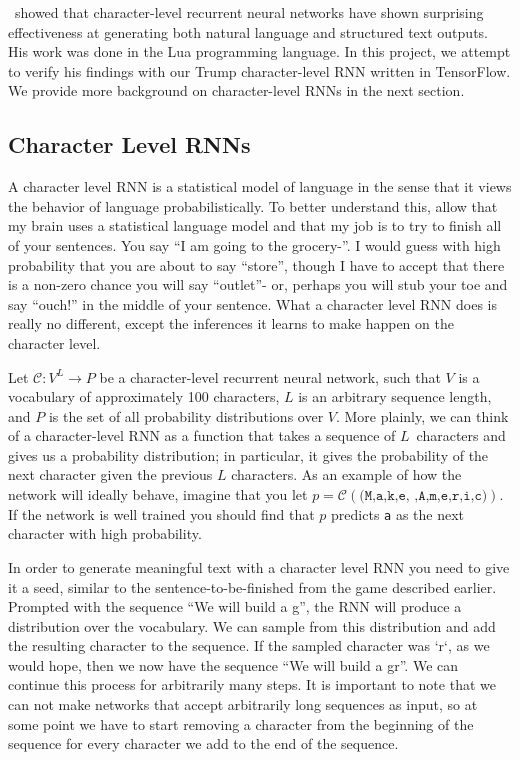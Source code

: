 \documentclass{article}
\begin{document}
\cite{karapathy2015}~showed that character-level recurrent neural networks have shown surprising effectiveness at generating both natural language and structured text outputs. His work was done in the Lua programming language.  In this project, we attempt to verify his findings with our Trump character-level RNN written in TensorFlow.  We provide more background on character-level RNNs in the next section.


\subsection{Character Level RNNs}

A character level RNN is a statistical model of language in the sense that it views the behavior of language probabilistically. To better understand this, allow that my brain uses a statistical language model and that my job is to try to finish all of your sentences. You say ``I am going to the grocery-''. I would guess with high probability that you are about to say ``store'', though I have to accept that there is a non-zero chance you will say ``outlet''- or, perhaps you will stub your toe and say ``ouch!'' in the middle of your sentence. What a character level RNN does is really no different, except the inferences it learns to make happen on the character level.

Let $\mathcal{C} : V^L \rightarrow P$ be a character-level recurrent neural network, such that $V$ is a vocabulary of approximately 100 characters, $L$ is an arbitrary sequence length, and $P$ is the set of all probability distributions over $V$. More plainly, we can think of a character-level RNN as a function that takes a sequence of $L$~characters and gives us a probability distribution; in particular, it gives the probability of the next character given the previous $L$ characters. As an example of how the network will ideally behave, imagine that you let $p = \mathcal{C}(\texttt{(M,a,k,e, ,A,m,e,r,i,c)})$. If the network is well trained you should find that $p$ predicts \texttt{a} as the next character with high probability.

In order to generate meaningful text with a character level RNN you need to give it a seed, similar to the sentence-to-be-finished from the game described earlier. Prompted with the sequence ``We will build a g'', the RNN will produce a distribution over the vocabulary. We can sample from this distribution and add the resulting character to the sequence. If the sampled character was `r`, as we would hope, then we now have the sequence ``We will build a gr''. We can continue this process for arbitrarily many steps. It is important to note that we can not make networks that accept arbitrarily long sequences as input, so at some point we have to start removing a character from the beginning of the sequence for every character we add to the end of the sequence.
\end{document}
